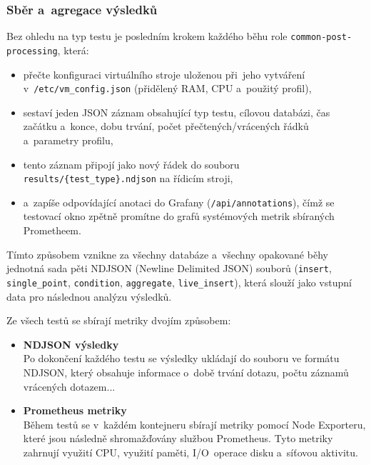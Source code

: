 \subsubsection{Sběr a~agregace výsledků}
Bez ohledu na typ testu je posledním krokem každého běhu role \texttt{common-post-processing}, která:
\begin{itemize}
    \item přečte konfiguraci virtuálního stroje uloženou při~jeho vytváření v~\texttt{/etc/vm\_config.json} (přidělený RAM, CPU a~použitý profil),
    \item sestaví jeden JSON záznam obsahující typ testu, cílovou databázi, čas začátku a~konce, dobu trvání, počet přečtených/vrácených řádků a~parametry profilu,
    \item tento záznam připojí jako nový řádek do souboru \texttt{results/\{test\_type\}.ndjson} na řídicím stroji,
    \item a~zapíše odpovídající anotaci do Grafany (\texttt{/api/annotations}), čímž se testovací okno zpětně promítne do grafů systémových metrik sbíraných Prometheem.
\end{itemize}

Tímto způsobem vznikne za všechny databáze a~všechny opakované běhy jednotná sada pěti NDJSON (Newline Delimited JSON) souborů (\texttt{insert}, \texttt{single\_point}, \texttt{condition}, \texttt{aggregate}, \texttt{live\_insert}), která slouží jako vstupní data pro následnou analýzu výsledků.

Ze všech testů se sbírají metriky dvojím způsobem:
\begin{itemize}
    \item \textbf{NDJSON výsledky} \\
    Po dokončení každého testu se výsledky ukládají do souboru ve formátu NDJSON, který obsahuje informace o~době trvání dotazu, počtu záznamů vrácených dotazem...
    \item \textbf{Prometheus metriky} \\
    Během testů se v~každém kontejneru sbírají metriky pomocí Node Exporteru, které jsou následně shromažďovány službou Prometheus. 
    Tyto metriky zahrnují využití CPU, využití paměti, I/O~operace disku a~síťovou aktivitu.
\end{itemize}
